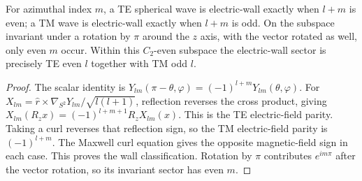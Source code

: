 \begin{lemma}
\label{cd:parities}
For azimuthal index $m$, a TE spherical wave is electric-wall
exactly when $l+m$ is even; a TM wave is electric-wall exactly
when $l+m$ is odd. On the subspace invariant under a rotation by
$\pi$ around the $z$ axis, with the vector rotated as well, only
even $m$ occur. Within this $C_2$-even subspace the electric-wall
sector is precisely TE even $l$ together with TM odd $l$.
\end{lemma}
\begin{proof}
The scalar identity is
$Y_{lm}(\pi-\theta,\varphi)=(-1)^{l+m}Y_{lm}(\theta,\varphi)$.
For $X_{lm}=\widehat r\times\nabla_{S^2}Y_{lm}/\sqrt{l(l+1)}$,
reflection reverses the cross product, giving
$X_{lm}(R_zx)=(-1)^{l+m+1}R_zX_{lm}(x)$.
This is the TE electric-field parity. Taking a curl reverses
that reflection sign, so the TM electric-field parity is
$(-1)^{l+m}$. The Maxwell curl equation gives the opposite
magnetic-field sign in each case. This proves the wall
classification. Rotation by $\pi$ contributes $e^{im\pi}$ after
the vector rotation, so its invariant sector has even $m$.
\end{proof}

